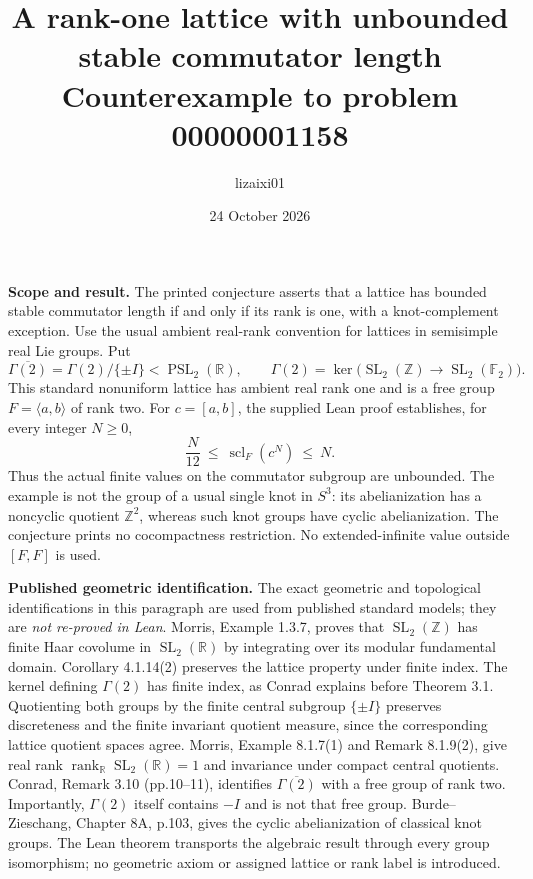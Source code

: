 \documentclass[10pt,a4paper]{article}
\title{A rank-one lattice with unbounded stable commutator length\\
\large Counterexample to problem 00000001158}
\author{lizaixi01}
\date{24 October 2026}
\newcommand{\scl}{\operatorname{scl}}
\newcommand{\PSL}{\operatorname{PSL}}
\newcommand{\SL}{\operatorname{SL}}
\begin{document}
\maketitle
\vspace{-6mm}

\textbf{Scope and result.}
The printed conjecture asserts that a lattice has bounded stable commutator
length if and only if its rank is one, with a knot-complement exception.
Use the usual ambient real-rank convention for lattices in semisimple real
Lie groups. Put
\[
 \overline{\Gamma(2)}=\Gamma(2)/\{\pm I\}<\PSL_2(\mathbb R),\qquad
 \Gamma(2)=\ker\bigl(\SL_2(\mathbb Z)\longrightarrow\SL_2(\mathbb F_2)\bigr).
\]
This standard nonuniform lattice has ambient real rank one and is a free
group $F=\langle a,b\rangle$ of rank two. For $c=[a,b]$, the supplied Lean
proof establishes, for every integer $N\ge0$,
\begin{equation}\label{bounds}
             \frac{N}{12}\ \le\ \scl_F(c^N)\ \le\ N.
\end{equation}
Thus the actual finite values on the commutator subgroup are unbounded.
The example is not the group of a usual single knot in $S^3$: its
abelianization has a noncyclic quotient $\mathbb Z^2$, whereas such knot
groups have cyclic abelianization. The conjecture prints no cocompactness
restriction. No extended-infinite value outside $[F,F]$ is used.

\textbf{Published geometric identification.}
The exact geometric and topological identifications in this paragraph are
used from published standard models; they are \emph{not re-proved in Lean}.
Morris, Example 1.3.7, proves that $\SL_2(\mathbb Z)$ has finite Haar
covolume in $\SL_2(\mathbb R)$ by integrating over its modular fundamental
domain. Corollary 4.1.14(2) preserves the lattice property under finite
index. The kernel defining $\Gamma(2)$ has finite index, as Conrad explains
before Theorem 3.1. Quotienting both groups by the finite central subgroup
$\{\pm I\}$ preserves discreteness and the finite invariant quotient
measure, since the corresponding lattice quotient spaces agree.
Morris, Example 8.1.7(1) and Remark 8.1.9(2), give real rank
$\operatorname{rank}_{\mathbb R}\SL_2(\mathbb R)=1$ and invariance under
compact central quotients. Conrad, Remark 3.10 (pp.10--11), identifies
$\overline{\Gamma(2)}$ with a free group of rank two. Importantly,
$\Gamma(2)$ itself contains $-I$ and is not that free group.
Burde--Zieschang, Chapter 8A, p.103, gives the cyclic abelianization of
classical knot groups. The Lean theorem transports the algebraic result
through every group isomorphism; no geometric axiom or assigned lattice
or rank label is introduced.
\end{document}
